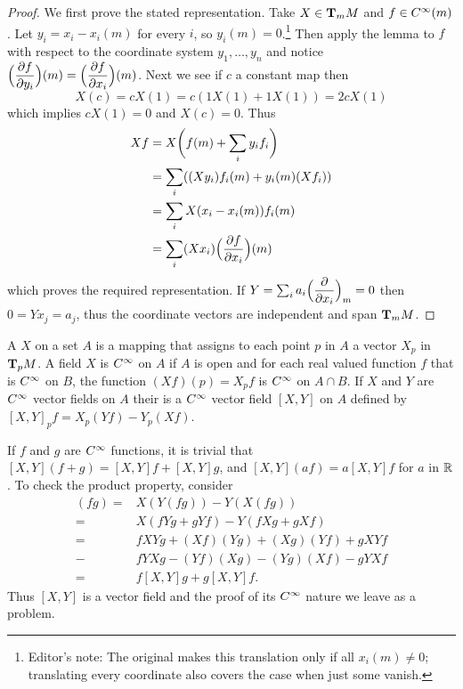\documentclass[../main]{subfiles}
\begin{document}
\begin{proof}
We first prove the stated representation. Take $X \in \tangentspace{M}{m}$ and $f \in \CInfty(m)$. Let $y_i=x_i-x_i(m)$ for every $i$, so $y_i(m)=0$.\footnote{Editor's note: The original makes this translation only if all $x_i(m)\ne0$; translating every coordinate also covers the case when just some vanish.} Then apply the lemma to $f$ with respect to the coordinate system $y_1, \dots, y_n$ and notice $\Big(\pdv{f}{y_i}\Big)(m)=\Big(\pdv{f}{x_i}\Big)(m)$. Next we see if $c$ a constant map then \[X(c)=cX(1)=c(1X(1)+1X(1))=2cX(1)\] which implies $cX(1)=0$ and $X(c)=0$. Thus \begin{align*}
    Xf&=X\bigg(f(m)+\sum_i y_i f_i\bigg)\\
    &=\sum_i((Xy_i)f_i(m)+y_i(m)(Xf_i))\\
    &=\sum_iX(x_i-x_i(m))f_i(m)\\
    &=\sum_i(Xx_i)\Big(\pdv{f}{x_i}\Big)(m)
\end{align*}
which proves the required representation. If $Y=\sum_i a_i\Big(\pdv{}{x_i}\Big)_m=0$ then $0=Yx_j=a_j$, thus the coordinate vectors are independent and span $\tangentspace{M}{m}$.
\end{proof}

A  $X$ on a set $A$ is a mapping that assigns to each point $p$ in $A$ a vector $X_p$ in $\tangentspace{M}{p}$. A field $X$ is $\CInfty$ on $A$ if $A$ is open and for each real valued function $f$ that is $\CInfty$ on $B$, the function $(Xf)(p)=X_pf$ is $\CInfty$ on $A \cap B$. If $X$ and $Y$ are $\CInfty$ vector fields on $A$ their  is a $\CInfty$ vector field $[X, Y]$ on $A$ defined by $[X, Y]_pf=X_p(Yf)-Y_p(Xf)$.

If $f$ and $g$ are $\CInfty$ functions, it is trivial that $[X,Y](f+g)=[X, Y] f+[X, Y]g$, and $[X, Y](a f)=a[X, Y]f$ for $a$ in $\bR$. To check the product property, consider
\begin{align*}
[X, Y](f g)=&X(Y(f g))-Y(X(f g))\\
=& X(f Y g+g Y f)-Y(f X g+g X f) \\
=& f X Y g+(X f)(Y g)+(X g)(Y f)+g X Y f\\
-& f Y X g-(Y f)(X g)-(Y g)(X f)-g Y X f \\
=& f[X, Y] g+g[X, Y] f.
\end{align*}
Thus $[X, Y]$ is a vector field and the proof of its $\CInfty$ nature we leave as a problem.
\end{document}
